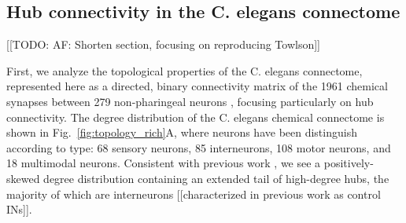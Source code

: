 \documentclass[10pt,letterpaper]{article}
\begin{document}
\subsection*{Hub connectivity in the C. elegans connectome}
[[TODO: AF: Shorten section, focusing on reproducing Towlson]]

First, we analyze the topological properties of the C. elegans connectome, represented here as a directed, binary connectivity matrix of the 1961 chemical synapses between 279 non-pharingeal neurons \cite{Varshney2011}, focusing particularly on hub connectivity.
The degree distribution of the C. elegans chemical connectome is shown in Fig.~\ref{fig:topology_rich}A, where neurons have been distinguish according to type: 68 sensory neurons, 85 interneurons, 108 motor neurons, and 18 multimodal neurons.
Consistent with previous work \cite{Towlson:2013gf}, we see a positively-skewed degree distribution containing an extended tail of high-degree hubs, the majority of which are interneurons [[characterized in previous work as control INs]].

\end{document}
